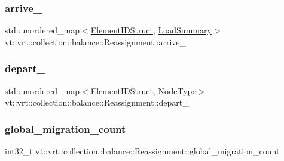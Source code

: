 \subsubsection{\texorpdfstring{arrive\+\_\+}{arrive\_}}
{\footnotesize\ttfamily std\+::unordered\+\_\+map$<$\hyperlink{namespacevt_1_1vrt_1_1collection_1_1balance_a9f5b53fafb270212279a4757d2c4cd28}{Element\+I\+D\+Struct}, \hyperlink{structvt_1_1vrt_1_1collection_1_1balance_1_1_load_summary}{Load\+Summary}$>$ vt\+::vrt\+::collection\+::balance\+::\+Reassignment\+::arrive\+\_\+}

\mbox{\label{structvt_1_1vrt_1_1collection_1_1balance_1_1_reassignment_a8fa0e732209e0f186eb10a15b29a0914}} 
\subsubsection{\texorpdfstring{depart\+\_\+}{depart\_}}
{\footnotesize\ttfamily std\+::unordered\+\_\+map$<$\hyperlink{namespacevt_1_1vrt_1_1collection_1_1balance_a9f5b53fafb270212279a4757d2c4cd28}{Element\+I\+D\+Struct}, \hyperlink{namespacevt_a866da9d0efc19c0a1ce79e9e492f47e2}{Node\+Type}$>$ vt\+::vrt\+::collection\+::balance\+::\+Reassignment\+::depart\+\_\+}

\mbox{\label{structvt_1_1vrt_1_1collection_1_1balance_1_1_reassignment_a4887608a57a19a896481f22d2ad11ce2}} 
\subsubsection{\texorpdfstring{global\+\_\+migration\+\_\+count}{global\_migration\_count}}
{\footnotesize\ttfamily int32\+\_\+t vt\+::vrt\+::collection\+::balance\+::\+Reassignment\+::global\+\_\+migration\+\_\+count}

